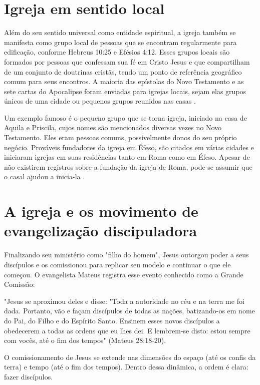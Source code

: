 \documentclass[12pt]{abntex2}
\begin{document}
\section{Igreja em sentido local}

Além do seu sentido universal como entidade espiritual, a igreja também se manifesta como grupo local de pessoas que se encontram regularmente para edificação, conforme Hebreus 10:25 e Efésios 4:12. Esses grupos locais são formados por pessoas que confessam sua fé em Cristo Jesus e que compartilham de um conjunto de doutrinas cristãs, tendo um ponto de referência geográfico comum para seus encontros. A maioria das epístolas do Novo Testamento e as sete cartas do Apocalipse foram enviadas para igrejas locais, sejam elas grupos únicos de uma cidade ou pequenos grupos reunidos nas casas \cite[p. 320]{zac}. 

Um exemplo famoso é o pequeno grupo que se torna igreja, iniciado na casa de Aquila e Priscila, cujos nomes são mencionados diversas vezes no Novo Testamento. Eles eram pessoas comuns, possivelmente donos do seu próprio negócio. Prováveis fundadores da igreja em Éfeso, são citados em várias cidades e iniciaram igrejas em suas residências tanto em Roma como em Éfeso. Apesar de não existirem registros sobre a fundação da igreja de Roma, pode-se assumir que o casal ajudou a inicia-la \cite[p. 54]{stetzer}.

\section{A igreja e os movimento de evangelização discipuladora}

Finalizando seu ministério como "filho do homem", Jesus outorgou poder a seus discípulos e os comissionou para replicar seu modelo e continuar o que ele começou. O evangelista Mateus registra esse evento conhecido como a Grande Comissão: 

\begin{citacao}
"Jesus se aproximou deles e disse: "Toda a autoridade no céu e na terra me foi dada. Portanto, vão e façam discípulos de todas as nações, batizando-os em nome do Pai, do Filho e do Espírito Santo. Ensinem esses novos discípulos a obedecerem a todas as ordens que eu lhes dei. E lembrem-se disto: estou sempre com vocês, até o fim dos tempos" (Mateus 28:18-20).
\end{citacao}

O comissionamento de Jesus se extende nas dimensões do espaço (até os confis da terra) e tempo (até o fim dos tempos). Dentro dessa dinâmica, a ordem é clara: fazer discípulos.  
\end{document}
